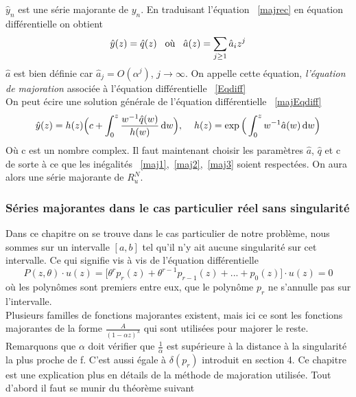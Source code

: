\documentclass[a4paper,10.5pt]{article}
\begin{document}
	$\hat{y}_n$ est une série majorante de $y_n$. En traduisant l'équation ~\eqref{majrec} en équation différentielle on obtient
	\begin{equation}
	[\theta-\hat{a}(z)] \hat{y}(z) = \hat{q}(z) \hspace{3mm} \text{où} \hspace{3mm} \hat{a}(z)=\sum_{j \geq 1} \hat{a}_iz^j
	\label{majEqdiff}
	\end{equation}
	$\hat{a}$ est bien définie car $\hat{a}_j=O(\alpha^j)$, $j \rightarrow \infty$. On appelle cette équation, \textit{l'équation de majoration} associée à l'équation différentielle ~\eqref{Eqdiff}\\
	On peut écire une solution générale de l'équation différentielle ~\eqref{majEqdiff} 
	\begin{equation}
	\hat{y}(z)=h(z)\Big(c+\int_{0}^{z}\frac{w^{-1}\hat{q}(w)}{h(w)}\, \mathrm{d}w\Big), \hspace{4mm} h(z)=\exp\Big(\int_{0}^{z}w^{-1}\hat{a}(w)\, \mathrm{d}w\Big)
	\end{equation}
	Où c est un nombre complex. Il faut maintenant choisir les paramètres $\hat{a}$, $\hat{q}$ et c de sorte à ce que les inégalités ~\eqref{maj1},~\eqref{maj2},~\eqref{maj3} soient respectées. On aura alors une série majorante de $R_u^{N}$.
	
	\subsubsection{Séries majorantes dans le cas particulier réel sans singularité}
	
	Dans ce chapitre on se trouve dans le cas particulier de notre problème, nous sommes sur un intervalle $[a,b]$ tel qu'il n'y ait aucune singularité sur cet intervalle. Ce qui signifie vis à vis de l'équation différentielle
	\[P(z,\theta) \cdot u(z)=\big[\theta^{r}p_r(z)+\theta^{r-1}p_{r-1}(z)+...+p_0(z)\big]\cdot u(z)=0 \tag{*}\]
	où les polynômes sont premiers entre eux, que le polynôme $p_r$ ne s'annulle pas sur l'intervalle.\\
	
	Plusieurs familles de fonctions majorantes existent, mais ici ce sont les  fonctions majorantes de la forme $\frac{A}{(1-\alpha z)^\lambda}$ qui sont utilisées pour majorer le reste. Remarquons que $\alpha$ doit vérifier que $\frac{1}{\alpha}$ est supérieure à la distance à la singularité la plus proche de f. C'est aussi égale à $\delta(p_r)$ introduit en section 4.
	Ce chapitre est une explication plus en détails de la méthode de majoration utilisée. Tout d'abord il faut se munir du théorème suivant
	
\end{document}
